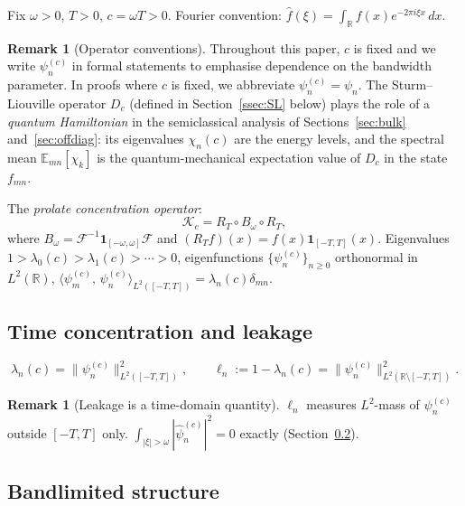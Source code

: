 \documentclass[12pt,a4paper]{amsart}
\theoremstyle{definition}
\newtheorem{remark}[theorem]{Remark}
\newcommand{\Kop}{\mathcal{K}_c}
\newcommand{\psin}{\psi_n^{(c)}}
\newcommand{\ip}[2]{\langle #1,\, #2\rangle}
\newcommand{\Emn}{\mathbb{E}_{mn}}
\begin{document}
Fix $\omega > 0$, $T > 0$, $c = \omega T > 0$.
Fourier convention: $\hat{f}(\xi) = \int_{\mathbb{R}} f(x)e^{-2\pi i\xi x}\,dx$.

\begin{remark}[Operator conventions]\label{rem:operator-conventions}
Throughout this paper, $c$ is fixed and we write $\psi_n^{(c)}$
in formal statements to emphasise dependence on the bandwidth
parameter. In proofs where $c$ is fixed, we abbreviate
$\psi_n^{(c)} = \psi_n$.
The Sturm--Liouville operator $D_c$ (defined in
Section~\ref{ssec:SL} below) plays the role of a
\emph{quantum Hamiltonian} in the semiclassical analysis of
Sections~\ref{sec:bulk} and~\ref{sec:offdiag}: its eigenvalues
$\chi_n(c)$ are the energy levels, and the spectral mean
$\Emn[\chi_k]$ is the quantum-mechanical expectation value of
$D_c$ in the state $f_{mn}$.
\end{remark}

The \emph{prolate concentration operator}:
\begin{equation}\label{eq:Kop_def}
  \Kop = R_T \circ B_\omega \circ R_T,
\end{equation}
where $B_\omega = \mathcal{F}^{-1}\mathbf{1}_{[-\omega,\omega]}\mathcal{F}$
and $(R_T f)(x) = f(x)\mathbf{1}_{[-T,T]}(x)$.
Eigenvalues $1 > \lambda_0(c) > \lambda_1(c) > \cdots > 0$,
eigenfunctions $\{\psin\}_{n\ge 0}$ orthonormal in $L^2(\mathbb{R})$,
$\ip{\psi_m^{(c)}}{\psin}_{L^2([-T,T])} = \lambda_n(c)\delta_{mn}$.

\subsection{Time concentration and leakage}

\begin{equation}\label{eq:time_conc}
  \lambda_n(c) = \|\psin\|_{L^2([-T,T])}^2,
  \qquad
  \ell_n := 1-\lambda_n(c)
  = \|\psin\|_{L^2(\mathbb{R}\setminus[-T,T])}^2.
\end{equation}

\begin{remark}[Leakage is a time-domain quantity]\label{rem:leakage}
$\ell_n$ measures $L^2$-mass of $\psin$ outside $[-T,T]$ only.
$\int_{|\xi|>\omega}|\hat\psin|^2 = 0$ exactly
(Section~\ref{ssec:bandlimited}).
\end{remark}

\subsection{Bandlimited structure}\label{ssec:bandlimited}
\end{document}
